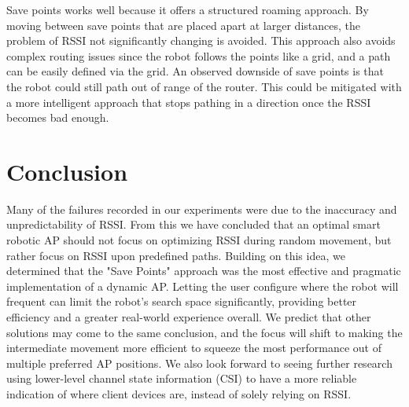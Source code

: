   

Save points works well because it offers a structured roaming approach. By moving between save points that are placed apart at larger distances, the problem of RSSI not significantly changing is avoided. This approach also avoids complex routing issues since the robot follows the points like a grid, and a path can be easily defined via the grid. An observed downside of save points is that the robot could still path out of range of the router. This could be mitigated with a more intelligent approach that stops pathing in a direction once the RSSI becomes bad enough.

  

\section{Conclusion}

Many of the failures recorded in our experiments were due to the inaccuracy and unpredictability of RSSI. From this we have concluded that an optimal smart robotic AP should not focus on optimizing RSSI during random movement, but rather focus on RSSI upon predefined paths. Building on this idea, we determined that the "Save Points" approach was the most effective and pragmatic implementation of a dynamic AP. Letting the user configure where the robot will frequent can limit the robot’s search space significantly, providing better efficiency and a greater real-world experience overall. We predict that other solutions may come to the same conclusion, and the focus will shift to making the intermediate movement more efficient to squeeze the most performance out of multiple preferred AP positions. We also look forward to seeing further research using lower-level channel state information (CSI) to have a more reliable indication of where client devices are, instead of solely relying on RSSI.